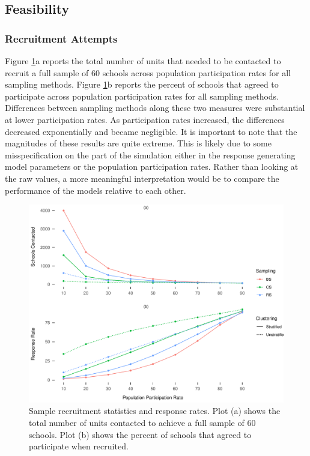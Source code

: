 \documentclass[man,floatsintext]{apa6}
\begin{document}
\hypertarget{feasibility-1}{%
\subsection{Feasibility}\label{feasibility-1}}

\hypertarget{recruitment-attempts}{%
\subsubsection{Recruitment Attempts}\label{recruitment-attempts}}

Figure \ref{fig:fig-responses}a reports the total number of units that needed to be contacted to recruit a full sample of 60 schools across population participation rates for all sampling methods. Figure \ref{fig:fig-responses}b reports the percent of schools that agreed to participate across population participation rates for all sampling methods. Differences between sampling methods along these two measures were substantial at lower participation rates. As participation rates increased, the differences decreased exponentially and became negligible. It is important to note that the magnitudes of these results are quite extreme. This is likely due to some misspecification on the part of the simulation either in the response generating model parameters or the population participation rates. Rather than looking at the raw values, a more meaningful interpretation would be to compare the performance of the models relative to each other.

\begin{figure}
\centering
\includegraphics{GenSamp-Paper_files/figure-latex/fig-responses-1.pdf}
\caption{\label{fig:fig-responses}Sample recruitment statistics and response rates. Plot (a) shows the total number of units contacted to achieve a full sample of 60 schools. Plot (b) shows the percent of schools that agreed to participate when recruited.}
\end{figure}
\end{document}
